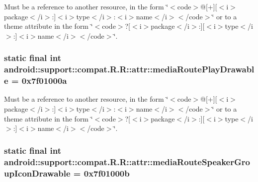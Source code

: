 Must be a reference to another resource, in the form \char`\"{}$<$code$>$@\mbox{[}+\mbox{]}\mbox{[}$<$i$>$package$<$/i$>$:\mbox{]}$<$i$>$type$<$/i$>$:$<$i$>$name$<$/i$>$$<$/code$>$\char`\"{} or to a theme attribute in the form \char`\"{}$<$code$>$?\mbox{[}$<$i$>$package$<$/i$>$:\mbox{]}\mbox{[}$<$i$>$type$<$/i$>$:\mbox{]}$<$i$>$name$<$/i$>$$<$/code$>$\char`\"{}. \hypertarget{classandroid_1_1support_1_1compat_1_1_r_1_1attr_a6b0f70589360e284e3e497fe38f7a16}{
\subsubsection[{mediaRoutePlayDrawable}]{\setlength{\rightskip}{0pt plus 5cm}static final int android::support::compat.R.R::attr::mediaRoutePlayDrawable = 0x7f01000a}}
\label{classandroid_1_1support_1_1compat_1_1_r_1_1attr_a6b0f70589360e284e3e497fe38f7a16}


Must be a reference to another resource, in the form \char`\"{}$<$code$>$@\mbox{[}+\mbox{]}\mbox{[}$<$i$>$package$<$/i$>$:\mbox{]}$<$i$>$type$<$/i$>$:$<$i$>$name$<$/i$>$$<$/code$>$\char`\"{} or to a theme attribute in the form \char`\"{}$<$code$>$?\mbox{[}$<$i$>$package$<$/i$>$:\mbox{]}\mbox{[}$<$i$>$type$<$/i$>$:\mbox{]}$<$i$>$name$<$/i$>$$<$/code$>$\char`\"{}. \hypertarget{classandroid_1_1support_1_1compat_1_1_r_1_1attr_67b62c173a518a812cd87804fc767b24}{
\subsubsection[{mediaRouteSpeakerGroupIconDrawable}]{\setlength{\rightskip}{0pt plus 5cm}static final int android::support::compat.R.R::attr::mediaRouteSpeakerGroupIconDrawable = 0x7f01000b}}
\label{classandroid_1_1support_1_1compat_1_1_r_1_1attr_67b62c173a518a812cd87804fc767b24}


